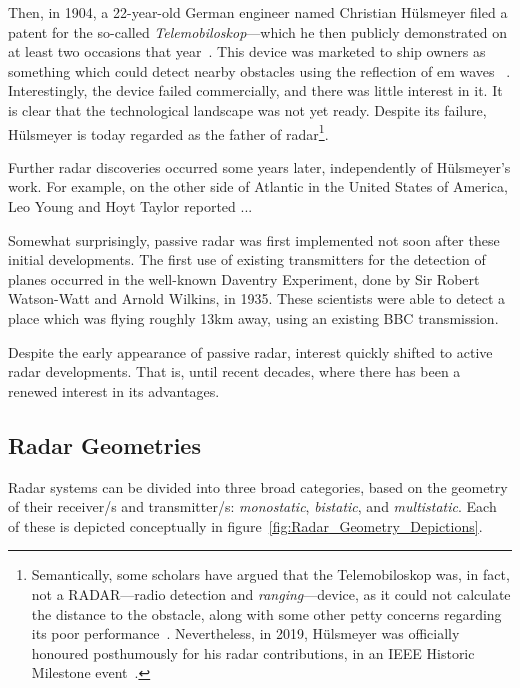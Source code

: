 \documentclass[class=report,11pt,crop=false]{standalone}
\begin{document}
Then, in 1904, a 22-year-old German engineer named Christian H\"ulsmeyer filed a patent for the so-called \emph{Telemobiloskop}---which he then publicly demonstrated on at least two occasions that year~\cite{Galati2014}. This device was marketed to ship owners as something which could detect nearby obstacles using the reflection of \gls{em} waves ~\cite{}. Interestingly, the device failed commercially, and there was little interest in it. It is clear that the technological landscape was not yet ready. Despite its failure, H\"ulsmeyer is today regarded as the father of radar\footnote{Semantically, some scholars have argued that the Telemobiloskop was, in fact, not a RADAR---radio detection and \emph{ranging}---device, as it could not calculate the distance to the obstacle, along with some other petty concerns regarding its poor performance~\cite{pritchard1989radar}. Nevertheless, in 2019, H\"ulsmeyer was officially honoured posthumously for his radar contributions, in an IEEE Historic Milestone event~\cite{Griffiths2019}.}.

Further radar discoveries occurred some years later, independently of H\"ulsmeyer's work. For example, on the other side of Atlantic in the United States of America, Leo Young and Hoyt Taylor reported ...

Somewhat surprisingly, passive radar was first implemented not soon after these initial developments. The first use of existing transmitters for the detection of planes occurred in the well-known Daventry Experiment, done by Sir Robert Watson-Watt and Arnold Wilkins, in 1935. These scientists were able to detect a place which was flying roughly 13km away, using an existing BBC transmission.

Despite the early appearance of passive radar, interest quickly shifted to active radar developments. That is, until recent decades, where there has been a renewed interest in its advantages.

\subsection{Radar Geometries}

Radar systems can be divided into three broad categories, based on the geometry of their receiver/s and transmitter/s: \emph{monostatic}, \emph{bistatic}, and \emph{multistatic}. Each of these is depicted conceptually in figure~\ref{fig:Radar_Geometry_Depictions}.
\end{document}
